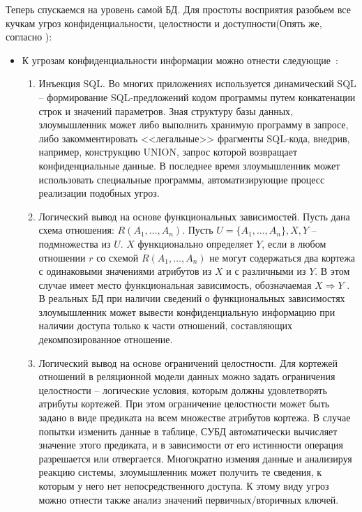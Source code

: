 Теперь спускаемся на уровень самой БД. Для простоты восприятия разобьем все кучкам угроз конфиденциальности, целостности и доступности(Опять же, согласно \autocite{Ytebov2008}):
\begin{itemize}
	\item К угрозам конфиденциальности информации можно отнести следующие~\label{ygr:conf}:
	\begin{enumerate}
		\item Инъекция SQL. Во многих приложениях используется динамический SQL -- формирование SQL-предложений кодом программы путем конкатенации строк и значений параметров. Зная структуру базы данных, злоумышленник может либо выполнить хранимую программу в запросе, либо закомментировать <<легальные>> фрагменты SQL-кода, внедрив, например, конструкцию UNION, запрос которой возвращает конфиденциальные данные. В последнее время злоумышленник может использовать специальные программы, автоматизирующие процесс реализации подобных угроз.
		
		\item Логический вывод на основе функциональных зависимостей. Пусть дана схема отношения: $R(A_1,\ldots,A_n)$. Пусть $U = \{A_1,\ldots,A_n\}, X ,Y$ -- подмножества из $U$. $X$ функционально определяет $Y$, если в любом отношении $r$ со схемой $R(A_1,\ldots,A_n)$ не могут содержаться два кортежа с одинаковыми значениями атрибутов из $X$ и с различными из $Y$. В этом случае имеет место функциональная зависимость, обозначаемая $X \Rightarrow Y$ . В реальных БД при наличии сведений о функциональных зависимостях злоумышленник может вывести конфиденциальную информацию при наличии доступа только к части отношений, составляющих декомпозированное отношение.
		
		\item Логический вывод на основе ограничений целостности. Для кортежей отношений в реляционной модели данных можно задать ограничения целостности -- логические условия, которым должны удовлетворять атрибуты кортежей. При этом ограничение целостности может быть задано в виде предиката на всем множестве атрибутов кортежа. В случае попытки изменить данные в таблице, СУБД автоматически вычисляет значение этого предиката, и в зависимости от его истинности операция разрешается или отвергается. Многократно изменяя данные и анализируя реакцию системы, злоумышленник может получить те сведения, к которым	у него нет непосредственного доступа. К этому виду угроз можно отнести также анализ значений первичных/вторичных ключей.
		

\end{enumerate}
\end{itemize}
